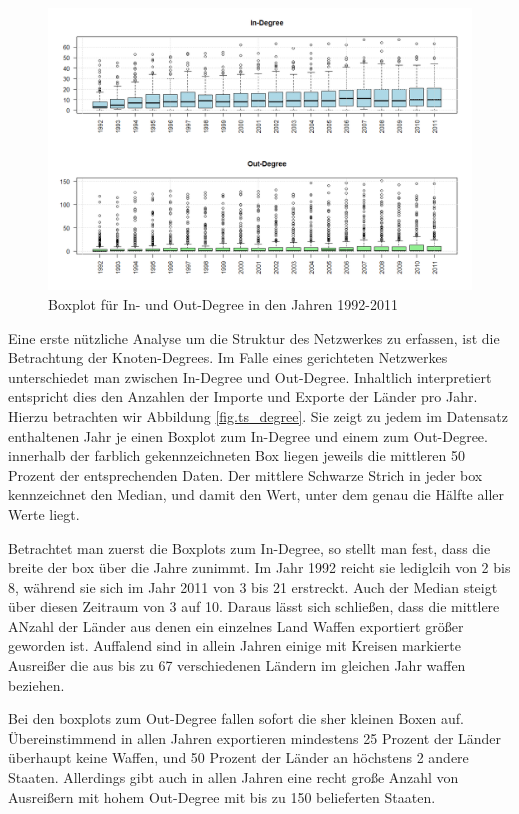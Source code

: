 \documentclass[a4paper,ngerman,oneside,titlepage,bibliography=totoc,11pt]{scrreprt}
\begin{document}
\begin{figure}[h]
	\centering
		\includegraphics[width=1.00\textwidth]{Grafiken/ts_degree.png}
	\caption{Boxplot für In- und Out-Degree in den Jahren 1992-2011}
	\label{fig:ts_degree}
\end{figure}

Eine erste nützliche Analyse um die Struktur des Netzwerkes zu erfassen, ist die Betrachtung der Knoten-Degrees. Im Falle eines gerichteten Netzwerkes unterschiedet man zwischen In-Degree und Out-Degree. Inhaltlich interpretiert entspricht dies den Anzahlen der Importe und Exporte der Länder pro Jahr. Hierzu betrachten wir Abbildung \ref{fig.ts_degree}. Sie zeigt zu jedem im Datensatz enthaltenen Jahr je einen Boxplot zum In-Degree und einem zum Out-Degree. innerhalb der farblich gekennzeichneten Box liegen jeweils die mittleren 50 Prozent der entsprechenden Daten. Der mittlere Schwarze Strich in jeder box kennzeichnet den Median, und damit den Wert, unter dem genau die Hälfte aller Werte liegt.

Betrachtet man zuerst die Boxplots zum In-Degree, so stellt man fest, dass die breite der box über die Jahre zunimmt. Im Jahr 1992 reicht sie lediglcih von 2 bis 8, während sie sich im Jahr 2011 von 3 bis 21 erstreckt. Auch der Median steigt über diesen Zeitraum von  3 auf 10. Daraus lässt sich schließen, dass die mittlere ANzahl der Länder aus denen ein einzelnes Land Waffen exportiert größer geworden ist. Auffalend sind in allein Jahren einige mit Kreisen markierte Ausreißer
die aus bis zu 67 verschiedenen Ländern im gleichen Jahr waffen beziehen.

Bei den boxplots zum Out-Degree fallen sofort die sher kleinen Boxen auf. Übereinstimmend in allen Jahren exportieren mindestens 25 Prozent der Länder überhaupt keine Waffen, und 50 Prozent der Länder an höchstens 2 andere Staaten. Allerdings gibt auch in allen Jahren eine recht große Anzahl von Ausreißern mit hohem Out-Degree mit bis zu 150 belieferten Staaten. 
\end{document}
